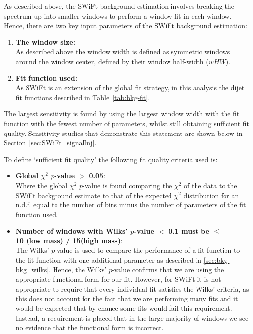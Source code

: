 As described above, the SWiFt background estimation involves breaking the spectrum up into smaller windows to perform a window fit in each window.
Hence, there are two key input parameters of the SWiFt background estimation:
\begin{enumerate}[leftmargin=*]
\item \textbf{The window size:}\\
  As described above the window width is defined as symmetric windows around the window center, defined by their window half-width ($wHW$).\vspace{0.5em}
\item \textbf{Fit function used:}\\
  As SWiFt is an extension of the global fit strategy,
  in this analysis the dijet fit functions described in Table~\ref{tab:bkg-fit}.
\end{enumerate}
The largest sensitivity is found by using the largest window width with the fit function with the fewest number of parameters, whilst still obtaining sufficient fit quality.
Sensitivity studies that demonstrate this statement are shown below in Section~\ref{sec:SWiFt_signalInj}.

\noindent
To define `sufficient fit quality' the following fit quality criteria used is:
\begin{itemize}[leftmargin=*]
  
\item \textbf{Global $\chi^{2}$ \mbox{$p$-value} $>$ 0.05}:\\
  Where the global $\chi^{2}$ \mbox{$p$-value} is found comparing the $\chi^{2}$ of the data to the SWiFt background estimate
  to that of the expected  $\chi^{2}$ distribution for an n.d.f. equal to the number of bins minus the number of parameters of the fit function used.\vspace{0.5em}
  
\item \textbf{Number of windows with Wilks' \mbox{$p$-value} $<$ 0.1 must be $\leq$ \\10 (low mass) / 15(high mass)}:\\
  The Wilks' \mbox{$p$-value} is used to compare the performance of a fit function to the fit function with one additional parameter
  as described in \ref{sec:bkg-bkg_wilks}. Hence, the Wilks' \mbox{$p$-value} confirms that we are using the appropriate functional form for our fit.
  However, for SWiFt it is not appropriate to require that every individual fit satisfies the Wilks' criteria,
  as this does not account for the fact that we are performing many fits and it would be expected that by chance some fits would fail this requirement.
  Instead, a requirement is placed that in the large majority of windows we see no evidence that the functional form is incorrect.
\end{itemize}

